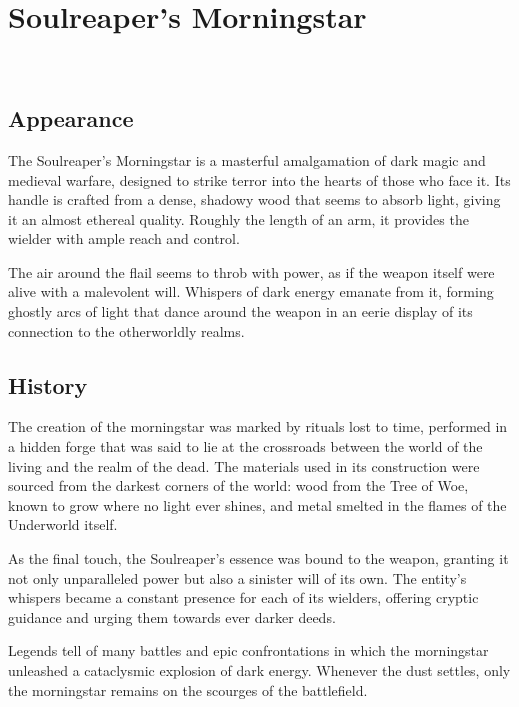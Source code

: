
\chapter*{Soulreaper's Morningstar}
\\

\section*{Appearance}
The Soulreaper's Morningstar is a masterful amalgamation of dark magic and medieval warfare, designed to strike terror into the hearts of those who face it. Its handle is crafted from a dense, shadowy wood that seems to absorb light, giving it an almost ethereal quality. Roughly the length of an arm, it provides the wielder with ample reach and control.

The air around the flail seems to throb with power, as if the weapon itself were alive with a malevolent will. Whispers of dark energy emanate from it, forming ghostly arcs of light that dance around the weapon in an eerie display of its connection to the otherworldly realms.

\section*{History}
The creation of the morningstar was marked by rituals lost to time, performed in a hidden forge that was said to lie at the crossroads between the world of the living and the realm of the dead. The materials used in its construction were sourced from the darkest corners of the world: wood from the Tree of Woe, known to grow where no light ever shines, and metal smelted in the flames of the Underworld itself.

As the final touch, the Soulreaper's essence was bound to the weapon, granting it not only unparalleled power but also a sinister will of its own. The entity's whispers became a constant presence for each of its wielders, offering cryptic guidance and urging them towards ever darker deeds.

Legends tell of many battles and epic confrontations in which the morningstar unleashed a cataclysmic explosion of dark energy. Whenever the dust settles, only the morningstar remains on the scourges of the battlefield.

